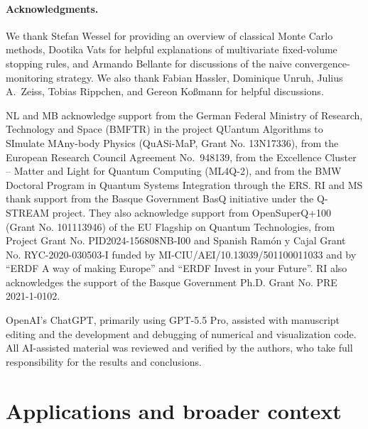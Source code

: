 \documentclass[showpacs,amsmath,amssymb,twocolumn,prx,superscriptaddress,10pt,aps,nofootinbib]{revtex4-2}
\begin{document}

\paragraph*{Acknowledgments.}
We thank Stefan Wessel for providing an overview of classical Monte Carlo methods, Dootika Vats for helpful explanations of multivariate fixed-volume stopping rules, and Armando Bellante for discussions of the naive convergence-monitoring strategy. We also thank Fabian Hassler, Dominique Unruh, Julius A.~Zeiss, Tobias Rippchen, and Gereon Ko{\ss}mann for helpful discussions.

NL and MB acknowledge support from the German Federal Ministry of Research, Technology and Space (BMFTR) in the project QUantum Algorithms to SImulate MAny-body Physics (QuASi-MaP, Grant No. 13N17336), from the European Research Council Agreement No.~948139, from the Excellence Cluster – Matter and Light for Quantum Computing (ML4Q-2), and from the BMW Doctoral Program in Quantum Systems Integration through the ERS.
%
RI and MS thank support from the Basque Government BasQ initiative under the Q-STREAM project. They also acknowledge support from OpenSuperQ+100 (Grant No. 101113946) of the EU Flagship on Quantum Technologies, from Project Grant No. PID2024-156808NB-I00 and Spanish Ram\'on y Cajal Grant No. RYC-2020-030503-I funded by MI-CIU/AEI/10.13039/501100011033 and by “ERDF A way of making Europe” and “ERDF Invest in your Future”. RI also acknowledges the support of the Basque Government Ph.D. Grant No. PRE 2021-1-0102.


OpenAI’s ChatGPT, primarily using GPT-5.5 Pro, assisted with manuscript editing and the development and debugging of numerical and visualization code. All AI-assisted material was reviewed and verified by the authors, who take full responsibility for the results and conclusions.





%

\newpage
\appendix

\tableofcontents

\section{Applications and broader context}
\end{document}
